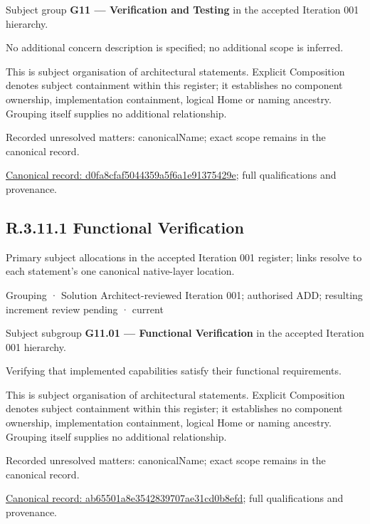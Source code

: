 Subject group \textbf{G11 — Verification and Testing} in the accepted Iteration 001 hierarchy.



No additional concern description is specified; no additional scope is inferred.



This is subject organisation of architectural statements. Explicit Composition denotes subject containment within this register; it establishes no component ownership, implementation containment, logical Home or naming ancestry. Grouping itself supplies no additional relationship.


{\small Recorded unresolved matters: canonicalName; exact scope remains in the canonical record.}\par
{\footnotesize \href{../../../../continuum/grouping/d0fa8cfaf5044359a5f6a1e91375429e.md}{Canonical record: d0fa8cfaf5044359a5f6a1e91375429e}; full qualifications and provenance.}\par
\subsection*{R.3.11.1 Functional Verification}
\label{navigation:R.3.11.1}

Primary subject allocations in the accepted Iteration 001 register; links resolve to each statement’s one canonical native-layer location.\par
\label{element:ab65501a8e3542839707ae31cd0b8efd}
{\small Grouping · Solution Architect-reviewed Iteration 001; authorised ADD; resulting increment review pending · current}\par

Subject subgroup \textbf{G11.01 — Functional Verification} in the accepted Iteration 001 hierarchy.



Verifying that implemented capabilities satisfy their functional requirements.



This is subject organisation of architectural statements. Explicit Composition denotes subject containment within this register; it establishes no component ownership, implementation containment, logical Home or naming ancestry. Grouping itself supplies no additional relationship.


{\small Recorded unresolved matters: canonicalName; exact scope remains in the canonical record.}\par
{\footnotesize \href{../../../../continuum/grouping/ab65501a8e3542839707ae31cd0b8efd.md}{Canonical record: ab65501a8e3542839707ae31cd0b8efd}; full qualifications and provenance.}\par

